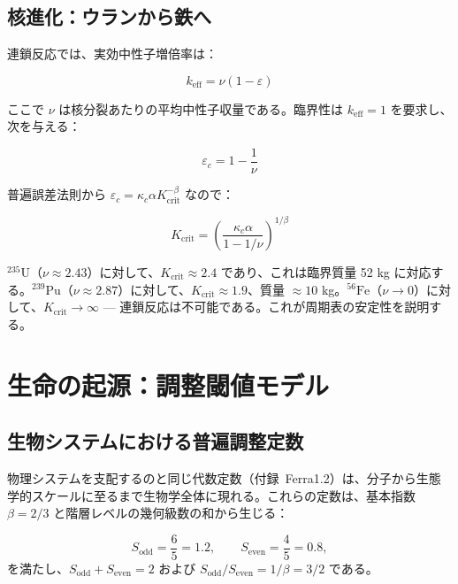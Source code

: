 \documentclass[12pt,a4paper]{article}
\newcommand{\kappac}{\kappa_c}
\newcommand{\eps}{\varepsilon}
\theoremstyle{remark}
\begin{document}
	\subsection{核進化：ウランから鉄へ}
	\label{subsec:nuclear}
	
	連鎖反応では、実効中性子増倍率は：
	
	\begin{equation}
		k_{\text{eff}} = \nu (1 - \eps)
		\label{eq:keff-nuclear}
	\end{equation}
	
	ここで \(\nu\) は核分裂あたりの平均中性子収量である。臨界性は \(k_{\text{eff}} = 1\) を要求し、次を与える：
	
	\begin{equation}
		\eps_c = 1 - \frac{1}{\nu}
		\label{eq:eps-c-nuclear}
	\end{equation}
	
	普遍誤差法則から \(\eps_c = \kappac \alpha K_{\text{crit}}^{-\beta}\) なので：
	
	\begin{equation}
		K_{\text{crit}} = \left( \frac{\kappac \alpha}{1 - 1/\nu} \right)^{1/\beta}
		\label{eq:Kcrit-nuclear}
	\end{equation}
	
	\(^{235}\text{U}\)（\(\nu \approx 2.43\)）に対して、\(K_{\text{crit}} \approx 2.4\) であり、これは臨界質量 52 kg に対応する。\(^{239}\text{Pu}\)（\(\nu \approx 2.87\)）に対して、\(K_{\text{crit}} \approx 1.9\)、質量 \(\approx 10\) kg。\(^{56}\text{Fe}\)（\(\nu \to 0\)）に対して、\(K_{\text{crit}} \to \infty\) — 連鎖反応は不可能である。これが周期表の安定性を説明する。
	
	\section{生命の起源：調整閾値モデル}
	\label{sec:origin-life}
	
	\subsection{生物システムにおける普遍調整定数}
	\label{subsec:bio-constants}
	
	物理システムを支配するのと同じ代数定数（付録~Ferra1.2）は、分子から生態学的スケールに至るまで生物学全体に現れる。これらの定数は、基本指数 \(\beta = 2/3\) と階層レベルの幾何級数の和から生じる：
	
	\[
	S_{\mathrm{odd}} = \frac{6}{5}=1.2,\qquad S_{\mathrm{even}} = \frac{4}{5}=0.8,
	\]
	を満たし、\(S_{\mathrm{odd}}+S_{\mathrm{even}}=2\) および \(S_{\mathrm{odd}}/S_{\mathrm{even}} = 1/\beta = 3/2\) である。
	
\end{document}
